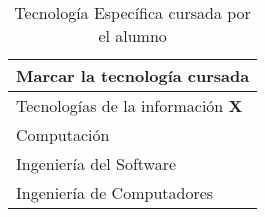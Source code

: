 \documentclass{pre-tfg}
\begin{document}
\begin{table}[hp]
  \centering
  \caption{Tecnología Específica cursada por el alumno}
  \label{tab:tec-especifica}

  \begin{tabular}{p{}}
    \textbf{Marcar la tecnología cursada} \\
    \hline
    Tecnologías de la información \hspace*{2cm} \textbf{X}\\
    Computación \\
    Ingeniería del Software \\
    Ingeniería de Computadores \\
    \hline
  \end{tabular}
\end{table}


\end{document}

